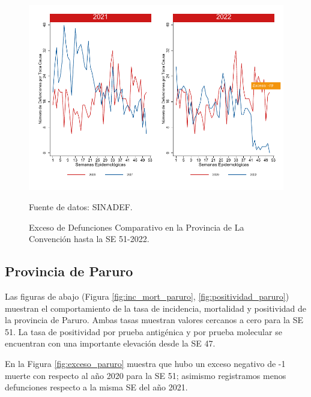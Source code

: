 \documentclass[12pt,a4paper,openany]{book}
\begin{document}
	\begin{figure}[h]
		\caption{Exceso de Defunciones Comparativo en la Provincia de La Convención hasta la SE 51-2022.}\label{fig:exceso_laconv}
		\begin{center}
			\includegraphics[width=0.7\linewidth]{../figuras/exceso_9.pdf}
		\end{center}
		{\footnotesize {Fuente de datos: SINADEF.}}
	\end{figure}
	
	\clearpage
	
	\subsection*{Provincia de Paruro}
	\noindent Las figuras de abajo (Figura \ref{fig:inc_mort_paruro}, \ref{fig:positividad_paruro}) muestran el comportamiento de la tasa de incidencia, mortalidad y positividad de la provincia de Paruro. Ambas tasas muestran valores cercanos a cero para la SE 51. La tasa de positividad por prueba antigénica y por prueba molecular se encuentran con una importante elevación desde la SE 47.
	
	En la Figura \ref{fig:exceso_paruro} muestra que hubo un exceso negativo de -1 muerte con respecto al año 2020 para la SE 51; asimismo registramos menos defunciones respecto a la misma SE del año 2021.
	
\end{document}
